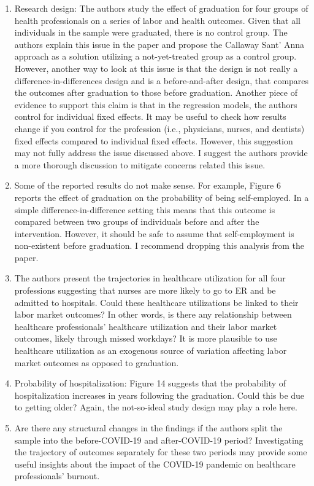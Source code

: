 \documentclass[12pt]{article}
\begin{document}
\begin{enumerate}
    \item Research design: The authors study the effect of graduation for four groups of health professionals on a series of labor and health outcomes. Given that all individuals in the sample were graduated, there is no control group. The authors explain this issue in the paper and propose the Callaway Sant' Anna approach as a solution utilizing a not-yet-treated group as a control group. However, another way to look at this issue is that the design is not really a difference-in-differences design and is a before-and-after design, that compares the outcomes after graduation to those before graduation. Another piece of evidence to support this claim is that in the regression models, the authors control for individual fixed effects. It may be useful to check how results change if you control for the profession (i.e., physicians, nurses, and dentists) fixed effects compared to individual fixed effects. However, this suggestion may not fully address the issue discussed above. I suggest the authors provide a more thorough discussion to mitigate concerns related this issue.
    \item Some of the reported results do not make sense. For example, Figure 6 reports the effect of graduation on the probability of being self-employed. In a simple difference-in-difference setting this means that this outcome is compared between two groups of individuals before and after the intervention. However, it should be safe to assume that self-employment is non-existent before graduation. I recommend dropping this analysis from the paper.
    \item The authors present the trajectories in healthcare utilization for all four professions suggesting that nurses are more likely to go to ER and be admitted to hospitals. Could these healthcare utilizations be linked to their labor market outcomes? In other words, is there any relationship between healthcare professionals' healthcare utilization and their labor market outcomes, likely through missed workdays? It is more plausible to use healthcare utilization as an exogenous source of variation affecting labor market outcomes as opposed to graduation.
    \item Probability of hospitalization: Figure 14 suggests that the probability of hospitalization increases in years following the graduation. Could this be due to getting older? Again, the not-so-ideal study design may play a role here.
    \item Are there any structural changes in the findings if the authors split the sample into the before-COVID-19 and after-COVID-19 period? Investigating the trajectory of outcomes separately for these two periods may provide some useful insights about the impact of the COVID-19 pandemic on healthcare professionals' burnout.
\end{enumerate}
\end{document}
